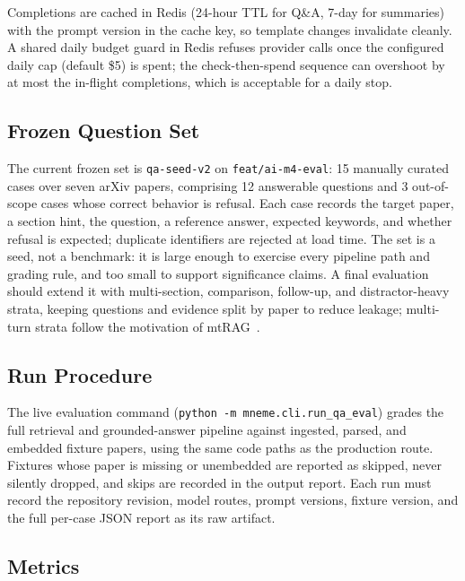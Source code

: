 Completions are cached in Redis (24-hour TTL for Q\&A, 7-day for summaries) with the prompt version in the cache key, so template changes invalidate cleanly.
A shared daily budget guard in Redis refuses provider calls once the configured daily cap (default \$5) is spent; the check-then-spend sequence can overshoot by at most the in-flight completions, which is acceptable for a daily stop.

\subsection{Frozen Question Set}

The current frozen set is \texttt{qa-seed-v2} on \texttt{feat/ai-m4-eval}: 15 manually curated cases over seven arXiv papers, comprising 12 answerable questions and 3 out-of-scope cases whose correct behavior is refusal.
Each case records the target paper, a section hint, the question, a reference answer, expected keywords, and whether refusal is expected; duplicate identifiers are rejected at load time.
The set is a seed, not a benchmark: it is large enough to exercise every pipeline path and grading rule, and too small to support significance claims.
A final evaluation should extend it with multi-section, comparison, follow-up, and distractor-heavy strata, keeping questions and evidence split by paper to reduce leakage; multi-turn strata follow the motivation of mtRAG~\cite{katsis2025mtrag}.

\subsection{Run Procedure}

The live evaluation command (\texttt{python -m mneme.cli.run\_qa\_eval}) grades the full retrieval and grounded-answer pipeline against ingested, parsed, and embedded fixture papers, using the same code paths as the production route.
Fixtures whose paper is missing or unembedded are reported as skipped, never silently dropped, and skips are recorded in the output report.
Each run must record the repository revision, model routes, prompt versions, fixture version, and the full per-case JSON report as its raw artifact.

\subsection{Metrics}

